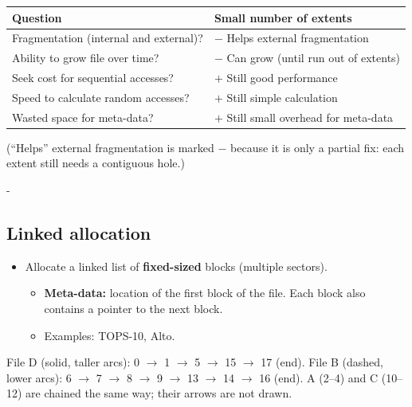 \documentclass[11pt,a4paper]{article}
\makeatletter
\newcommand{\keepspace}[1]{\par\penalty-100\begingroup
  \setlength{\dimen@}{#1}\dimen@ii\pagegoal\advance\dimen@ii-\pagetotal
  \ifdim\dimen@>\dimen@ii\ifdim\dimen@ii>\z@\vfil\fi\break\fi\endgroup}
\newcommand{\allocstrip}[2]{%
  \foreach \l [count=\i from 0] in {#1} {
    \node[ablk, f\l] (s\i) at (\i*0.74, #2) {\l};
  }
}
\newcommand{\stripindex}[2]{%
  \pgfmathtruncatemacro{\last}{#1-1}
  \foreach \i in {0,...,\last} {
    \node[font=\scriptsize, text=g3] at (\i*0.74, #2) {\i};
  }
}
\makeatother
\begin{document}
\begin{center}
\renewcommand{\arraystretch}{1.2}
\begin{tabularx}{\textwidth}{@{}lX@{}}
  \toprule
  \textbf{Question} & \textbf{Small number of extents} \\
  \midrule
  Fragmentation (internal and external)? & $-$ Helps external fragmentation \\
  Ability to grow file over time? & $-$ Can grow (until run out of extents) \\
  Seek cost for sequential accesses? & $+$ Still good performance \\
  Speed to calculate random accesses? & $+$ Still simple calculation \\
  Wasted space for meta-data? & $+$ Still small overhead for meta-data \\
  \bottomrule
\end{tabularx}
\end{center}

(``Helps'' external fragmentation is marked $-$ because it is only a partial
fix: each extent still needs a contiguous hole.)

\keepspace{8\baselineskip}
\subsection{Linked allocation}\label{sec:linked}

\begin{itemize}
  \item Allocate a linked list of \textbf{fixed-sized} blocks (multiple
        sectors).
  \begin{itemize}
    \item \textbf{Meta-data:} location of the first block of the file. Each
          block also contains a pointer to the next block.
    \item Examples: TOPS-10, Alto.
  \end{itemize}
\end{itemize}

\begin{center}

{\small File D (solid, taller arcs): 0 \(\to\) 1 \(\to\) 5 \(\to\) 15
\(\to\) 17 (end). File B (dashed, lower arcs): 6 \(\to\) 7 \(\to\) 8
\(\to\) 9 \(\to\) 13 \(\to\) 14 \(\to\) 16 (end). A (2--4) and C (10--12)
are chained the same way; their arrows are not drawn.}
\end{center}
\end{document}
